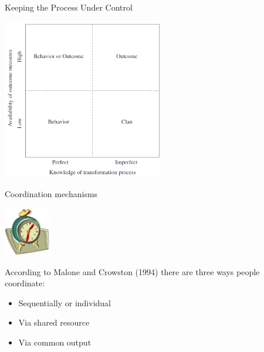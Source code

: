 \documentclass{beamer}
\begin{document}
\begin{frame}{\centerline{Keeping the Process Under Control}}

\begin{center}
\includegraphics[width=70mm]{A2022.IDSEPC.ProcessoDiProduzione/img-img03.png}
\end{center}
\end{frame}

\begin{frame}{\centerline{Coordination mechanisms}}
\begin{center}
\includegraphics[width=20mm]{A2022.IDSEPC.ProcessoDiProduzione/img-img10.png}
\end{center}

According to Malone and Crowston (1994) there are three ways people coordinate:
\begin{itemize}
\item  Sequentially or individual
\item  Via shared resource
\item  Via common output
\end{itemize}

\end{frame}
\end{document}
